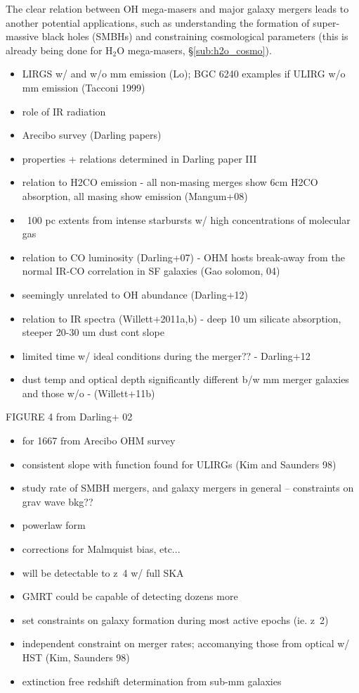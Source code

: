 The clear relation between OH mega-masers and major galaxy mergers leads to another potential applications, such as understanding the formation of super-massive black holes (SMBHs) and constraining cosmological parameters (this is already being done for H$_2$O mega-masers, \S\ref{sub:h2o_cosmo}). 

\begin{itemize}
\item LIRGS w/ and w/o mm emission (Lo); BGC 6240 examples if ULIRG w/o mm emission (Tacconi 1999)
\item role of IR radiation
\item Arecibo survey (Darling papers)
\item properties + relations determined in Darling paper III
\item relation to H2CO emission - all non-masing merges show 6cm H2CO absorption, all masing show emission (Mangum+08)
\item ~100 pc extents from intense starbursts w/ high concentrations of molecular gas
\item relation to CO luminosity (Darling+07) - OHM hosts break-away from the normal IR-CO correlation in SF galaxies (Gao solomon, 04)
\item seemingly unrelated to OH abundance  (Darling+12)
\item relation to IR spectra (Willett+2011a,b) - deep 10 um silicate absorption, steeper 20-30 um dust cont slope
\item limited time w/ ideal conditions during the merger?? - Darling+12
\item dust temp and optical depth significantly different b/w mm merger galaxies and those w/o - (Willett+11b)
\end{itemize}

FIGURE 4 from Darling+ 02

\begin{itemize}
\item for 1667 from Arecibo OHM survey
\item consistent slope with function found for ULIRGs (Kim and Saunders 98)
\item study rate of SMBH mergers, and galaxy mergers in general -- constraints on grav wave bkg??
\item powerlaw form
\item corrections for Malmquist bias, etc...
\item will be detectable to z~4 w/ full SKA
\item GMRT could be capable of detecting dozens more
\item set constraints on galaxy formation during most active epochs (ie. z~2)
\item independent constraint on merger rates; accomanying those from optical w/ HST (Kim, Saunders 98)
\item extinction free redshift determination from sub-mm galaxies
\end{itemize}

